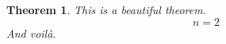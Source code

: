 \documentclass[a4paper, 12pt]{article}
\theoremstyle{definition}
\theoremstyle{plain}
\newtheorem{theorem}[definition]{Theorem}
\theoremstyle{remark}
\begin{document}
\begin{theorem}
    This is a beautiful theorem.
    \begin{equation}
        n = 2
    \end{equation}
    And voilà.
\end{theorem}
\end{document}
